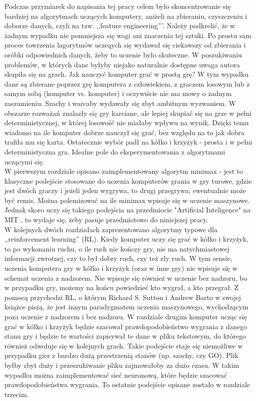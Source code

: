 \documentclass[licencjacka]{pracamgr}
\begin{document}
Podczas przymiarek do napisania tej pracy celem było skoncentrowanie się bardziej na algorytmach uczących komputery, aniżeli na zbieraniu, czyszczeniu i doborze danych, czyli na tzw. ,,feature engineering'''. Należy podkrelić,  że w żadnym wypadku nie pomniejsza się wagi ani znaczenia tej sztuki. Po prostu sam proces towrzenia lagorytmów uczeąych się wydawał się ciekawszy od zbierania i oróbki odpowiednich danych, żeby to uczenie było skuteczne. W poszukiwaniu problemów, w których dane byłyby niejako naturalnie dostępne uwaga autora skupiła się na grach. Jak nauczyć komputer grać w prostą grę?  W tym wypadku dane są zbierane poprzez grę komputera z człowiekiem, z graczem losowym lub z samym sobą (komputer vs. komputer) i oczywiście nie ma mowy o żadnym zaszumieniu. Szachy i warcaby wydawały się zbyt ambitnym wyzwaniem. W obszarze rozważań znalazły się gry karciane, ale lepiej skupiać się na grze w pełni deterministycznej, w której losowość nie miałaby wpływu na wynik. Dzięki temu wiadomo na ile komputer dobrze nauczył się grać, bez względu na to jak dobra trafiła mu się karta. Ostatecznie wybór padł na kółko i krzyżyk - prosta i w pełni deterministyczna gra. Idealne pole do eksperymentowania z algorytmami uczącymi się. \\

W pierwszym rozdziale opisano zaimplementowany algorytm minimax - jest to klasyczne podejście stosowane do uczenia komputerów grania w gry turowe, gdzie jest dwóch graczy i jeżeli jeden wygrywa, to drugi przegrywa; ewentualnie może być remis.  Można polemizować na ile minimax wpisuje się w uczenie maszynowe. Jednak skoro uczy się takiego podejścia na przedmiocie "Artificial Inteligence"  na MIT \cite{MIT_AI},  to wydaje się, żeby pasuje przedmiotowo do niniejszej pracy.\\

W kolejnych dwóch rozdziałach zaprezentowano algorytmy typowe dla ,,reinforcement learning'' (RL). Kiedy komputer uczy się grać w kółko i krzyżyk, to po wykonaniu ruchu, o ile ruch nie kończy gry,  nie ma natychmiastowej informacji zwrotnej, czy to był dobry ruch, czy też zły ruch. W tym sensie, uczenia komputera gry w kółko i krzyżyk (oraz w inne gry) nie wpisuje się w schemat uczenia z nadzorem. Nie wpisuje się również w uczenie bez nadzoru, bo w przypadku gry, możemy na końcu powiedzieć kto wygrał, a kto przegrał. Z pomocą przychodzi RL, o którym Richard S. Sutton i Andrew Barto w swojej książce \cite{RL} piszą, że jest innym paradygmatem uczenia maszynowego, wychodzącym poza uczenie z nadzorem i bez nadzoru.  W rozdziale drugim komputer ucząc się grać w kółko i krzyżyk będzie szacował prawdopodobieństwo wygrania z danego stanu gry i będzie te wartości zapisywał te dane w pliku tekstowym, do którego również odwołuje się w kolejnych grach. Takie podejście staje się niemożliwe w przypadku gier z bardzo dużą przestrzenią stanów (np. szachy, czy GO). Plik byłby zbyt duży i przeszukiwanie pliku zajmowałoby za dużo czasu. W takim wypadku można zaimplementować sieć neuronową, które będzie szacować prawdopodobieństwa wygrania. To ostatnie podejście opisane zostało w rozdziale trzecim. \\
\end{document}
